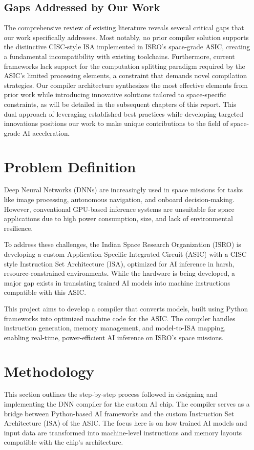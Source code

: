 \documentclass[12pt]{report}
\begin{document}
\section{Gaps Addressed by Our Work}
The comprehensive review of existing literature reveals several critical gaps that our work specifically addresses. Most notably, no prior compiler solution supports the distinctive CISC-style ISA implemented in ISRO's space-grade ASIC, creating a fundamental incompatibility with existing toolchains. Furthermore, current frameworks lack support for the computation splitting paradigm required by the ASIC's limited processing elements, a constraint that demands novel compilation strategies. Our compiler architecture synthesizes the most effective elements from prior work while introducing innovative solutions tailored to space-specific constraints, as will be detailed in the subsequent chapters of this report. This dual approach of leveraging established best practices while developing targeted innovations positions our work to make unique contributions to the field of space-grade AI acceleration.
\chapter{Problem Definition}

Deep Neural Networks (DNNs) are increasingly used in space missions for tasks like image processing, autonomous navigation, and onboard decision-making. However, conventional GPU-based inference systems are unsuitable for space applications due to high power consumption, size, and lack of environmental resilience.

To address these challenges, the Indian Space Research Organization (ISRO) is developing a custom Application-Specific Integrated Circuit (ASIC) with a CISC-style Instruction Set Architecture (ISA), optimized for AI inference in harsh, resource-constrained environments. While the hardware is being developed, a major gap exists in translating trained AI models into machine instructions compatible with this ASIC.

This project aims to develop a compiler that converts models, built using Python frameworks into optimized machine code for the ASIC. The compiler handles instruction generation, memory management, and model-to-ISA mapping, enabling real-time, power-efficient AI inference on ISRO’s space missions.

\chapter{Methodology}
This section outlines the step-by-step process followed in designing and implementing the DNN compiler for the custom AI chip. The compiler serves as a bridge between Python-based AI frameworks and the custom Instruction Set Architecture (ISA) of the ASIC. The focus here is on how trained AI models and input data are transformed into machine-level instructions and memory layouts compatible with the chip's architecture.
\end{document}
